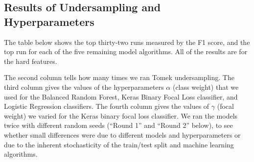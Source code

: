 \subsection{Results of Undersampling and Hyperparameters}

The table below shows the top thirty-two runs measured by the F1 score, and the top run for each of the five remaining model algorithms.  All of the results are for the hard features.  

The second column tells how many times we ran Tomek undersampling.  The third column gives the values of the hyperparameters $\alpha$ (class weight) that we used for the Balanced Random Forest, Keras Binary Focal Loss classifier, and Logistic Regression classifiers.  The fourth column gives the values of $\gamma$ (focal weight) we varied for the Keras binary focal loss classifier.  We ran the models twice with different random seeds (``Round 1'' and ``Round 2'' below), to see whether small differences were due to different models and hyperparameters or due to the inherent stochasticity of the train/test split and machine learning algorithms.  

\

